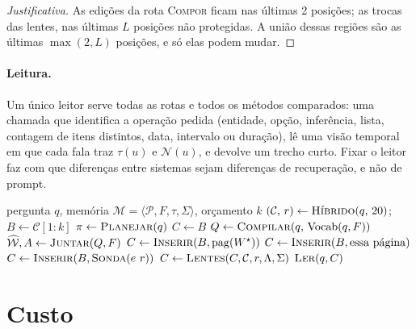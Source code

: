 \documentclass[11pt]{article}
\newcommand{\Compose}{\textsc{Compor}}
\begin{document}
\begin{proof}[Justificativa]
As edições da rota \Compose{} ficam nas últimas 2 posições; as trocas das
lentes, nas últimas $L$ posições não protegidas. A união dessas regiões são
as últimas $\max(2,L)$ posições, e só elas podem mudar.
\end{proof}

\paragraph{Leitura.}
Um único leitor serve todas as rotas e todos os métodos comparados: uma
chamada que identifica a operação pedida (entidade, opção, inferência, lista,
contagem de itens distintos, data, intervalo ou duração), lê uma visão
temporal em que cada fala traz $\tau(u)$ e $\mathcal{N}(u)$, e devolve um
trecho curto. Fixar o leitor faz com que diferenças entre sistemas sejam
diferenças de recuperação, e não de prompt.

\begin{algorithm}[t]
\caption{Pesquisador do WitnessRAG (uma pergunta)}\label{alg:pesquisador}
\begin{algorithmic}[1]
\Require pergunta $q$, memória $\mathcal{M}=\langle\mathcal{P},F,\tau,\Sigma\rangle$, orçamento $k$
\State $(\mathcal{C},\,r)\gets\textsc{Híbrido}(q,\,20)$; \quad $B\gets\mathcal{C}[1{:}k]$
\State $\pi\gets\textsc{Planejar}(q)$ 
\State $C\gets B$
\If{$\rho(\pi)=\Compose$} 
  \State $Q\gets\textsc{Compilar}(q,\,\mathrm{Vocab}(q,F))$ 
  \State $\widehat{\mathcal W},A\gets\textsc{Juntar}(Q,F)$ 
   
     \State $C\gets\textsc{Inserir}(B,\mathrm{pag}(W^\star))$ 
     \State $C\gets\textsc{Inserir}(B,\text{essa página})$ 
     \State $C\gets\textsc{Inserir}(B,\textsc{Sonda}(e\ r))$ 
  \EndIf
\EndIf
\If{$\Lambda(\pi)\neq\emptyset$}
  \State $C\gets\textsc{Lentes}(C,\mathcal{C},r,\Lambda,\Sigma)$ 
\EndIf
\State \Return $\textsc{Ler}(q,C)$ 
\end{algorithmic}
\end{algorithm}

\section{Custo}\label{sec:custo}
\end{document}
